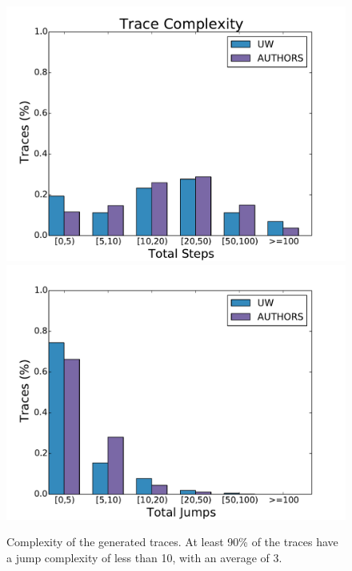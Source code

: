 %
\begin{figure}[t]
\centering
\includegraphics[width=\linewidth]{trace_size_step.pdf}
\includegraphics[width=\linewidth]{trace_size_jump.pdf}
\caption{Complexity of the generated traces. At least 90\% of the traces
  have a jump complexity of less than 10, with an average of 3.}
\label{fig:results-complexity}
\end{figure}
%

